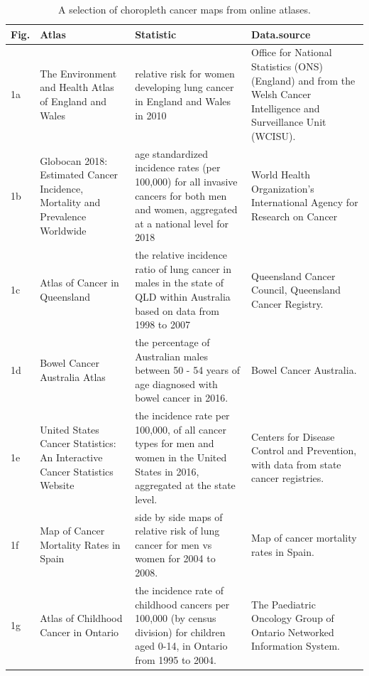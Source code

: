 \documentclass{monashthesis}
\begin{document}
\begin{table}

\caption{\label{tab:choropleths}A selection of choropleth cancer maps from online atlases.}
\centering
\begin{tabular}[t]{l>{\raggedright\arraybackslash}p{10em}>{\raggedright\arraybackslash}p{15em}>{\raggedright\arraybackslash}p{10em}}
\toprule
Fig. & Atlas & Statistic & Data.source\\
\midrule
1a & The Environment and Health Atlas of England and Wales & relative risk for women developing lung cancer in England and Wales in 2010 & Office for National Statistics (ONS) (England) and from the Welsh Cancer Intelligence and Surveillance Unit (WCISU).\\
1b & Globocan 2018: Estimated Cancer Incidence, Mortality and Prevalence Worldwide & age standardized incidence rates (per 100,000) for all invasive cancers for both men and women, aggregated at a national level for 2018 & World Health Organization's International Agency for Research on Cancer\\
\addlinespace
1c & Atlas of Cancer in Queensland & the relative incidence ratio of lung cancer in males in the state of QLD within Australia based on data from 1998 to 2007 & Queensland Cancer Council, Queensland Cancer Registry.\\
1d & Bowel Cancer Australia Atlas & the percentage of Australian males between 50 - 54 years of age diagnosed with bowel cancer in 2016. & Bowel Cancer Australia.\\
\addlinespace
1e & United States Cancer Statistics: An Interactive Cancer Statistics Website & the incidence rate per 100,000, of all cancer types for men and women in the United States in 2016, aggregated at the state level. & Centers for Disease Control and Prevention, with data from state cancer registries.\\
1f & Map of Cancer Mortality Rates in Spain & side by side maps of relative risk of lung cancer for men vs women for 2004 to 2008. & Map of cancer mortality rates in Spain.\\
\addlinespace
1g & Atlas of Childhood Cancer in Ontario & the incidence rate of childhood cancers per 100,000 (by census division) for children aged 0-14, in Ontario from 1995 to 2004. & The Paediatric Oncology Group of Ontario Networked Information System.\\
\bottomrule
\end{tabular}
\end{table}
\end{document}
